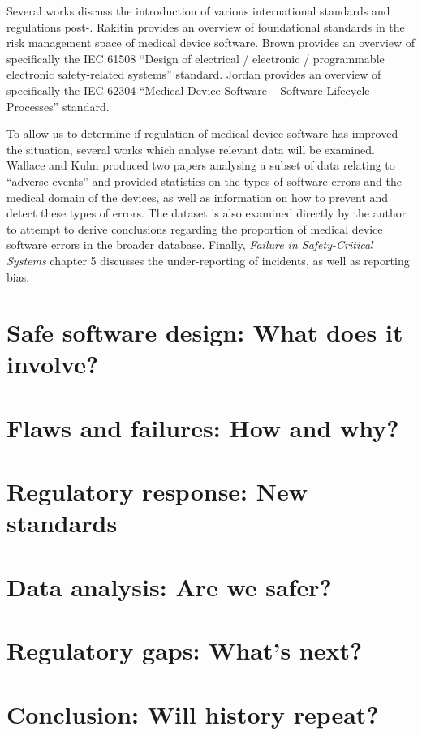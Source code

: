 \documentclass{cshonours}
\begin{document}
Several works discuss the introduction of various international standards and regulations post-\ther. Rakitin \cite{rakitin2006coping} provides an overview of foundational standards in the risk management space of medical device software. Brown \cite{brown2000overview} provides an overview of specifically the IEC 61508 ``Design of electrical / electronic / programmable electronic safety-related systems'' standard. Jordan \cite{jordan2006standard} provides an overview of specifically the IEC 62304 ``Medical Device Software -- Software Lifecycle Processes'' standard.

To allow us to determine if regulation of medical device software has improved the situation, several works which analyse relevant data will be examined. Wallace and Kuhn produced two papers \cite{wallace1999lessons,wallace2001failure} analysing a subset of \fda data relating to ``adverse events'' and provided statistics on the types of software errors and the medical domain of the devices, as well as information on how to prevent and detect these types of errors. The \fda \maude dataset \cite{maude} is also examined directly by the author to attempt to derive conclusions regarding the proportion of medical device software errors in the broader \maude database. Finally, \textit{Failure in Safety-Critical Systems} chapter 5 \cite{johnson2003failure} discusses the under-reporting of incidents, as well as reporting bias.

\chapter{Safe software design: What does it involve?}
\label{chap:safesoftware}

\chapter{Flaws and failures: How and why?}
\label{chap:flawsfailures}

\chapter{Regulatory response: New standards}
\label{chap:newstandards}

\chapter{Data analysis: Are we safer?}
\label{chap:data}

\chapter{Regulatory gaps: What's next?}
\label{chap:reggaps}

\chapter{Conclusion: Will history repeat?}
\label{chap:conclusion}


\appendix


\end{document}
